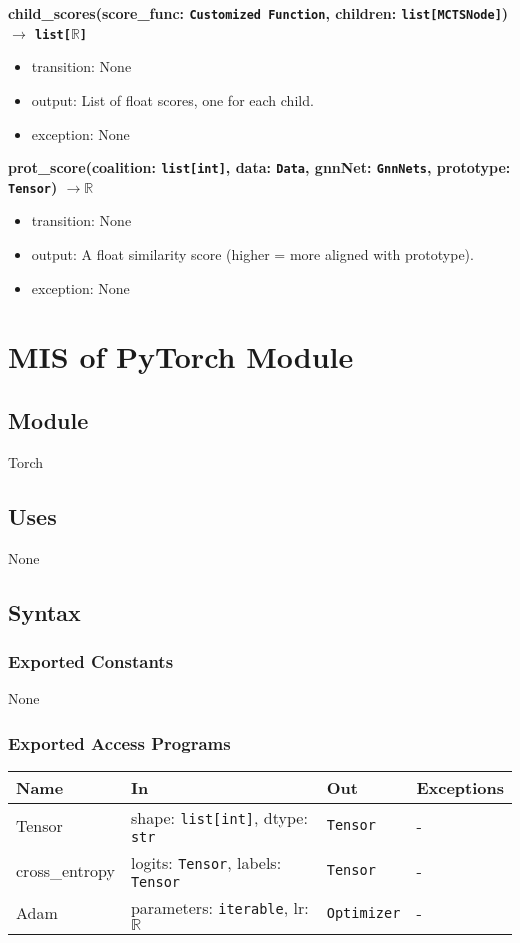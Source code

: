 \documentclass[12pt, titlepage]{article}
\begin{document}
\noindent 
\textbf{child\_scores(score\_func: \texttt{Customized Function}, children: \texttt{list[MCTSNode]}) \(\rightarrow\) \texttt{list[\(\mathbb{R}\)]}}
\begin{itemize}
  \item transition: None
  \item output: List of float scores, one for each child.
  \item exception: None
\end{itemize}

\noindent 
\textbf{prot\_score(coalition: \texttt{list[int]}, data: \texttt{Data}, gnnNet: \texttt{GnnNets}, prototype: \texttt{Tensor}) \(\rightarrow \mathbb{R}\)}
\begin{itemize}
  \item transition: None
  \item output: A float similarity score (higher = more aligned with prototype).
  \item exception: None
\end{itemize}




\section{MIS of PyTorch Module} \label{TorchModule}

\subsection{Module}
Torch

\subsection{Uses}
None

\subsection{Syntax}

\subsubsection{Exported Constants}
None

\subsubsection{Exported Access Programs}

\begin{center}
\begin{tabular}{p{3.2cm} p{5.5cm} p{4cm} p{2.5cm}}
\hline
\textbf{Name} & \textbf{In} & \textbf{Out} & \textbf{Exceptions} \\
\hline
Tensor & shape: \texttt{list[int]}, dtype: \texttt{str} & \texttt{Tensor} & - \\
cross\_entropy & logits: \texttt{Tensor}, labels: \texttt{Tensor} & \texttt{Tensor} & - \\
Adam & parameters: \texttt{iterable}, lr: \(\mathbb{R}\) & \texttt{Optimizer} & - \\
\hline
\end{tabular}
\end{center}
\end{document}
